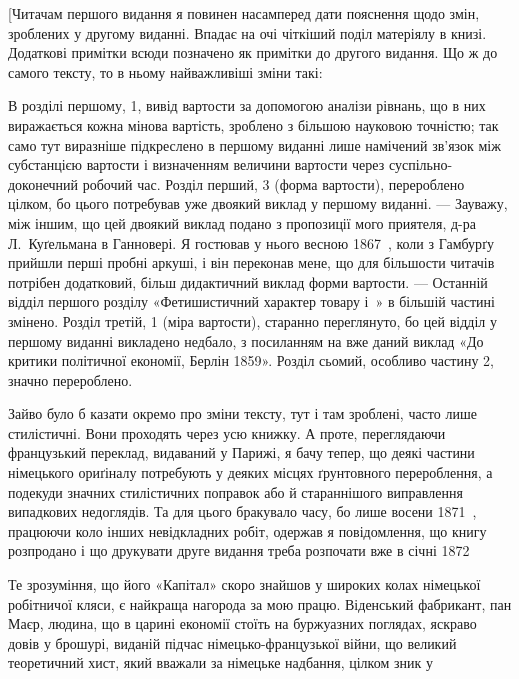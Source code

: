 
\label{original-81}
[Читачам першого видання я повинен насамперед дати пояснення
щодо змін, зроблених у другому виданні. Впадає на очі
чіткіший поділ матеріялу в книзі. Додаткові примітки всюди
позначено як примітки до другого видання. Що ж до самого тексту,
то в ньому найважливіші зміни такі:

В розділі першому, 1, вивід вартости за допомогою аналізи
рівнань, що в них виражається кожна мінова вартість, зроблено
з більшою науковою точністю; так само тут виразніше підкреслено
в першому виданні лише намічений зв’язок між субстанцією
вартости і визначенням величини вартости через суспільно-доконечний
робочий час. Розділ перший, 3 (форма вартости), перероблено
цілком, бо цього потребував уже двоякий виклад у
першому виданні. — Зауважу, між іншим, що цей двоякий виклад
подано з пропозиції мого приятеля, д-ра Л.~Куґельмана в Ганновері.
Я гостював у нього весною 1867~, коли з Гамбурґу
прийшли перші пробні аркуші, і він переконав мене, що для більшости
читачів потрібен додатковий, більш дидактичний виклад
форми вартости. — Останній відділ першого розділу «Фетишистичний
характер товару і~» в більшій частині змінено. Розділ
третій, 1 (міра вартости), старанно переглянуто, бо цей відділ
у першому виданні викладено недбало, з посиланням на вже даний
виклад «До критики політичної економії, Берлін 1859». Розділ
сьомий, особливо частину 2, значно перероблено.

Зайво було б казати окремо про зміни тексту, тут і там зроблені,
часто лише стилістичні. Вони проходять через усю книжку.
А проте, переглядаючи французький переклад, видаваний у Парижі,
я бачу тепер, що деякі частини німецького ориґіналу потребують
у деяких місцях ґрунтовного перероблення, а подекуди
значних стилістичних поправок або й стараннішого виправлення
випадкових недоглядів. Та для цього бракувало часу, бо лише
восени 1871~, працюючи коло інших невідкладних робіт, одержав
я повідомлення, що книгу розпродано і що друкувати друге
видання треба розпочати вже в січні 1872~

Те зрозуміння, що його «Капітал» скоро знайшов у широких
колах німецької робітничої кляси, є найкраща нагорода за мою
працю. Віденський фабрикант, пан Маєр, людина, що в царині
економії стоїть на буржуазних поглядах, яскраво довів у брошурі,
виданій підчас німецько-французької війни, що великий теоретичний
хист, який вважали за німецьке надбання, цілком зник у
\parbreak{}  %
